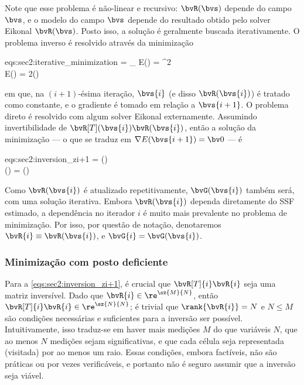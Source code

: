 Note que esse problema é não-linear e recursivo: $\bvR(\bvs)$ depende do campo $\bvs$, e o modelo do campo $\bvs$ depende do resultado obtido pelo solver Eikonal $\bvR(\bvs)$. Posto isso, a solução é geralmente buscada iterativamente. O problema inverso é resolvido através da minimização
\begin{subgather}{eqs:sec2:iterative_minimization}
			 = \arg\min_{\bvs{i+1}} E() = ^2 
			\label{subeq:sec2:iterative_minimization:eq1}\\
			\nabla E() = 2\tr{\bvR}() 
			\label{subeq:sec2:iterative_minimization:eq2}
\end{subgather}
em que, na $(i+1)$-ésima iteração, $\bvs{i}$ (e disso $\bvR(\bvs{i})$) é tratado como constante, e o gradiente é tomado em relação a $\bvs{i+1}$. O problema direto é resolvido com algum solver Eikonal externamente. Assumindo invertibilidade de $\bvR[T](\bvs{i})\bvR(\bvs{i})$, então a solução da minimização --- o que se traduz em $\nabla E(\bvs{i+1}) = \bv0$ --- é
\begin{subgather}{eqs:sec2:inversion_zi+1}
		 = \bvG() \bvt{\obs} \\
		\bvG() =  \tr{\bvR}()
\end{subgather}

Como $\bvR(\bvs{i})$ é atualizado repetitivamente, $\bvG(\bvs{i})$ também será, com uma solução iterativa. Embora $\bvR(\bvs{i})$ dependa diretamente do SSF estimado, a dependência no iterador $i$ é muito mais prevalente no problema de minimização. Por isso, por questão de notação, denotaremos $\bvR{i} \equiv \bvR(\bvs{i})$, e $\bvG{i} = \bvG(\bvs{i})$.

\subsubsection{Minimização com posto deficiente}
Para a \cref{eqs:sec2:inversion_zi+1}, é crucial que $\bvR[T]{i}\bvR{i}$ seja uma matriz inversível. Dado que $\bvR{i} \in \re^{\sz{M}{N}}$, então $\bvR[T]{i}\bvR{i} \in \re^{\sz{N}{N}}$; é trivial que $\rank{\bvR{i}} = N$ e $N \leq M$ são condições necessárias e suficientes para a inversão ser possível. Intuitivamente, isso traduz-se em haver mais medições $M$ do que variáveis $N$, que ao menos $N$ medições sejam significativas, e que cada célula seja representada (visitada) por ao menos um raio. Essas condições, embora factíveis, não são práticas ou por vezes verificáveis, e portanto não é seguro assumir que a inversão seja viável.

